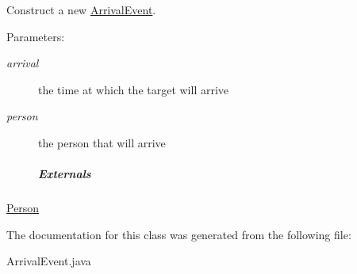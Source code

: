 Construct a new \hyperlink{class_arrival_event}{ArrivalEvent}. 

\begin{Desc}
\item[Parameters:]
\begin{description}
\item[{\em arrival}]the time at which the target will arrive \item[{\em person}]the person that will arrive \subparagraph*{Externals}\end{description}
\end{Desc}
\hyperlink{class_person}{Person} 

The documentation for this class was generated from the following file:\begin{CompactItemize}
\item 
ArrivalEvent.java\end{CompactItemize}
